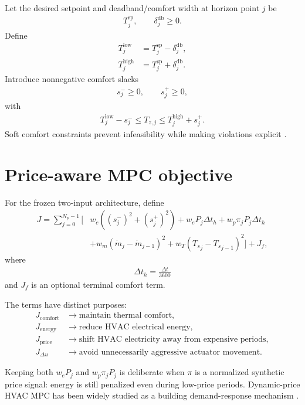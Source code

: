 \documentclass[11pt]{article}
\newcommand{\Ts}{T_s}
\newcommand{\mdot}{\dot m}
\newcommand{\dt}{\Delta t}
\begin{document}
Let the desired setpoint and deadband/comfort width at horizon point \(j\) be
\begin{align}
T^{\mathrm{sp}}_j,
\qquad
\delta^{\mathrm{db}}_j\ge0.
\end{align}
Define
\begin{align}
T^{\mathrm{low}}_j
&=
T^{\mathrm{sp}}_j-\delta^{\mathrm{db}}_j,
\\
T^{\mathrm{high}}_j
&=
T^{\mathrm{sp}}_j+\delta^{\mathrm{db}}_j.
\tag{6.62}
\end{align}
Introduce nonnegative comfort slacks
\begin{align}
s_j^-\ge0,
\qquad
s_j^+\ge0,
\end{align}
with
\begin{align}
T^{\mathrm{low}}_j-s_j^-
\le
T_{z,j}
\le
T^{\mathrm{high}}_j+s_j^+.
\tag{6.63}
\end{align}
Soft comfort constraints prevent infeasibility while making violations explicit
\citep{ma2012predictive,drgona2020all}.

\section{Price-aware MPC objective}

For the frozen two-input architecture, define
\begin{align}
J
=
\sum_{j=0}^{N_p-1}
\Big[
&
w_c
\left(
(s_j^-)^2+(s_j^+)^2
\right)
+
w_e
P_j\dt_h
+
w_p
\pi_jP_j\dt_h
\nonumber\\
&
+
w_m
(\mdot_j-\mdot_{j-1})^2
+
w_T
({\Ts}_j-{\Ts}_{j-1})^2
\Big]
+
J_f,
\tag{6.64}
\end{align}
where
\begin{align}
\dt_h=\frac{\dt}{3600}
\end{align}
and \(J_f\) is an optional terminal comfort term.

The terms have distinct purposes:
\begin{align}
J_{\mathrm{comfort}}
&\rightarrow
\text{maintain thermal comfort},
\\
J_{\mathrm{energy}}
&\rightarrow
\text{reduce HVAC electrical energy},
\\
J_{\mathrm{price}}
&\rightarrow
\text{shift HVAC electricity away from expensive periods},
\\
J_{\Delta u}
&\rightarrow
\text{avoid unnecessarily aggressive actuator movement}.
\end{align}

Keeping both \(w_eP_j\) and \(w_p\pi_jP_j\) is deliberate when \(\pi\) is a normalized synthetic
price signal: energy is still penalized even during low-price periods.  Dynamic-price HVAC MPC
has been widely studied as a building demand-response mechanism
\citep{avci2013price,amin2020price,zanetti2025flex}.
\end{document}
